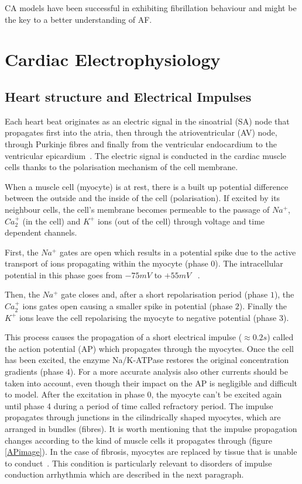 \documentclass{article}
\begin{document}
CA models have been successful in exhibiting fibrillation behaviour and might be the key to a better understanding of AF. 

\section{ Cardiac Electrophysiology} 
 

\subsection{ Heart structure and Electrical Impulses} 


Each heart beat originates as an electric signal in the sinoatrial (SA) node that propagates first into the atria, then through the atrioventricular (AV) node, through Purkinje fibres and finally from the ventricular endocardium to the ventricular epicardium~\cite{cardiacphys_book1987}. The electric signal is conducted in the cardiac muscle cells thanks to the polarisation mechanism of the cell membrane. 

When a muscle cell (myocyte) is at rest, there is a built up potential difference between the outside and the inside of the cell 
(polarisation). If excited by its neighbour cells, the cell's membrane  becomes permeable to the passage of $ Na^{+}$, $Ca_{2}^{+}$ (in the cell) and $K^{+}$ ions (out of the cell) through voltage and time dependent channels.

First, the $Na^{+}$  gates are open which results in a potential spike due to the active transport of ions propagating within the myocyte (phase $0$). The intracellular potential in this phase goes from $ -75  mV$ to $+55 mV $~\cite{cardiacphys_ap2009} . 
 
Then, the $Na^{+}$ gate closes and, after a short repolarisation period (phase $1$), the $Ca_{2}^{+}$ ions gates open causing a smaller spike in potential (phase $2$). Finally the $K^{+}$ ions leave the cell repolarising the myocyte to negative potential (phase 3).

This process causes the propagation of a short electrical impulse ($\approx 0.2s$) called the action potential (AP) which propagates through the myocytes. Once the cell has been excited, the enzyme Na/K-ATPase restores the original concentration gradients (phase $4$). For a more accurate analysis also other currents should be taken into account, even though their impact on the AP is negligible and difficult to model. After the excitation in phase $0$, the myocyte can't be excited again until phase 4 during a period of time called refractory period. The impulse propagates through junctions in the cilindrically shaped myocytes, which are arranged in bundles (fibres). It is worth mentioning that the impulse propagation changes according to the kind of muscle cells it propagates through (figure \ref{APimage}). In the case of fibrosis, myocytes are replaced by tissue that is unable to conduct~\cite{arrhythmia_fibrosis2007}. This condition is particularly relevant to disorders of impulse conduction arrhythmia which are described in the next paragraph. 
 
\end{document}
